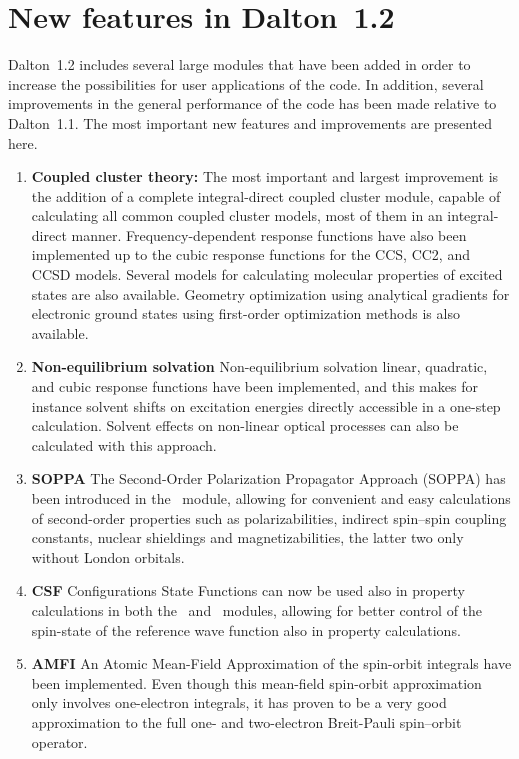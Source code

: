 \section{New features in Dalton~1.2}
Dalton~1.2 includes several large modules that have been added in order
to increase the possibilities for user applications of the code. In
addition, several improvements in the general performance of the code
has been made relative to Dalton~1.1. The most important new features
and improvements are presented here.

\begin{enumerate}
\item {\bf Coupled cluster theory:} The most important and largest
improvement is the addition of
a complete integral-direct coupled cluster module, capable of
calculating all common coupled cluster models, most of them in an
integral-direct manner. Frequency-dependent response functions have
also been implemented up to the cubic response functions for the CCS,
CC2, and CCSD models. Several models for calculating molecular
properties of excited states are also available. Geometry optimization
using analytical gradients for electronic ground states using
first-order optimization methods is also available.

\item {\bf Non-equilibrium solvation} Non-equilibrium
solvation linear, quadratic, and cubic response functions have been
implemented, and this
makes for instance solvent shifts on excitation energies directly
accessible in a one-step calculation. Solvent effects on non-linear
optical processes can also be calculated with this approach.

\item {\bf SOPPA} The Second-Order Polarization Propagator Approach (SOPPA) has
been introduced in the \aba\ module, allowing for convenient and easy
calculations of second-order properties such as polarizabilities,
indirect spin--spin coupling constants, nuclear shieldings and
magnetizabilities, the latter two only without London orbitals.

\item {\bf CSF} Configurations State Functions can now be used also in
property calculations in both the \resp\ and \aba\ modules, allowing
for better control of the spin-state of the reference wave function
also in property calculations.

\item {\bf AMFI} An Atomic Mean-Field Approximation of the spin-orbit
integrals have been implemented. Even though this mean-field
spin-orbit approximation only involves one-electron integrals, it has
proven to be a very good approximation to the full one- and
two-electron Breit-Pauli spin--orbit operator.


\end{enumerate}
